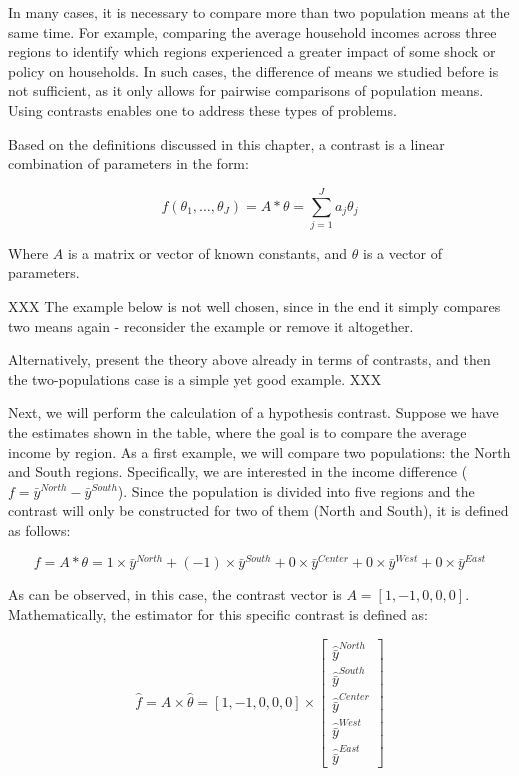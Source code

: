 \documentclass[
  12pt,
]{book}
\begin{document}
In many cases, it is necessary to compare more than two population means at the same time. For example, comparing the average household incomes across three regions to identify which regions experienced a greater impact of some shock or policy on households. In such cases, the difference of means we studied before is not sufficient, as it only allows for pairwise comparisons of population means. Using contrasts enables one to address these types of problems.

Based on the definitions discussed in this chapter, a contrast is a linear combination of parameters in the form:

\[
f \left( \theta_{1}, \ldots, \theta_{J} \right) = A * {\theta} = \sum_{j=1}^{J} a_{j} \theta_{j}
\]

Where \(A\) is a matrix or vector of known constants, and \(\theta\) is a vector of parameters.

XXX
The example below is not well chosen, since in the end it simply compares two means again - reconsider the example or remove it altogether.

Alternatively, present the theory above already in terms of contrasts, and then the two-populations case is a simple yet good example.
XXX

Next, we will perform the calculation of a hypothesis contrast. Suppose we have the estimates shown in the table, where the goal is to compare the average income by region. As a first example, we will compare two populations: the North and South regions. Specifically, we are interested in the income difference (\(f = \bar{y}^{North} - \bar{y}^{South}\)). Since the population is divided into five regions and the contrast will only be constructed for two of them (North and South), it is defined as follows:

\[
f = A * \theta = 1 \times \bar{y}^{North} + (-1) \times \bar{y}^{South} + 0 \times \bar{y}^{Center} + 0 \times \bar{y}^{West} + 0 \times \bar{y}^{East}
\]

As can be observed, in this case, the contrast vector is \(A = \left[1, -1, 0, 0, 0\right]\). Mathematically, the estimator for this specific contrast is defined as:

\[
\widehat{f} = A \times \widehat{\theta} = \left[1, -1, 0, 0, 0\right] \times \left[
\begin{array}{c}
\widehat{\bar{y}}^{North} \\
\widehat{\bar{y}}^{South} \\
\widehat{\bar{y}}^{Center} \\
\widehat{\bar{y}}^{West} \\
\widehat{\bar{y}}^{East}
\end{array}
\right]
\]
\end{document}
